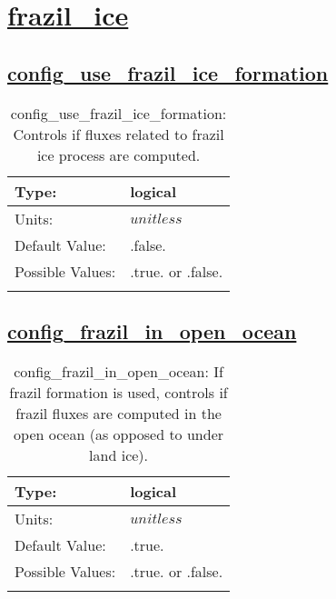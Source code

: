 \section[frazil\_ice]{\hyperref[sec:nm_tab_frazil_ice]{frazil\_ice}}
\label{sec:nm_sec_frazil_ice}
\subsection[config\_use\_frazil\_ice\_formation]{\hyperref[sec:nm_tab_frazil_ice]{config\_use\_frazil\_ice\_formation}}
\label{subsec:nm_sec_config_use_frazil_ice_formation}
\begin{center}
\begin{longtable}{| p{2.0in} || p{4.0in} |}
    \hline
    Type: & logical \\
    \hline
    Units: & $unitless$ \\
    \hline
    Default Value: & .false. \\
    \hline
    Possible Values: & .true. or .false. \\
    \hline
    \caption{config\_use\_frazil\_ice\_formation: Controls if fluxes related to frazil ice process are computed.}
\end{longtable}
\end{center}
\subsection[config\_frazil\_in\_open\_ocean]{\hyperref[sec:nm_tab_frazil_ice]{config\_frazil\_in\_open\_ocean}}
\label{subsec:nm_sec_config_frazil_in_open_ocean}
\begin{center}
\begin{longtable}{| p{2.0in} || p{4.0in} |}
    \hline
    Type: & logical \\
    \hline
    Units: & $unitless$ \\
    \hline
    Default Value: & .true. \\
    \hline
    Possible Values: & .true. or .false. \\
    \hline
    \caption{config\_frazil\_in\_open\_ocean: If frazil formation is used, controls if frazil fluxes are computed in the open ocean (as opposed to under land ice).}
\end{longtable}
\end{center}
